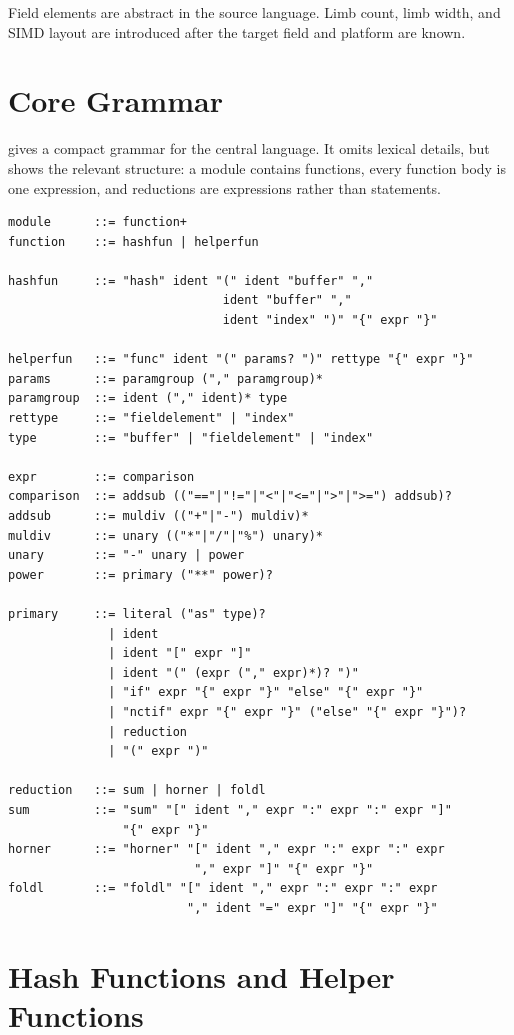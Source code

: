 Field elements are abstract in the source language. Limb count, limb width, and SIMD layout are introduced after the target field and platform are known.

\section{Core Grammar}
\label{sec:dsl-grammar}

 gives a compact grammar for the central language. It omits lexical details, but shows the relevant structure: a module contains functions, every function body is one expression, and reductions are expressions rather than statements.

\begin{lstlisting}[style=thesisBNF,caption={Core grammar of the DSL.},label={lst:dsl-grammar}]
module      ::= function+
function    ::= hashfun | helperfun

hashfun     ::= "hash" ident "(" ident "buffer" ","
                              ident "buffer" ","
                              ident "index" ")" "{" expr "}"

helperfun   ::= "func" ident "(" params? ")" rettype "{" expr "}"
params      ::= paramgroup ("," paramgroup)*
paramgroup  ::= ident ("," ident)* type
rettype     ::= "fieldelement" | "index"
type        ::= "buffer" | "fieldelement" | "index"

expr        ::= comparison
comparison  ::= addsub (("=="|"!="|"<"|"<="|">"|">=") addsub)?
addsub      ::= muldiv (("+"|"-") muldiv)*
muldiv      ::= unary (("*"|"/"|"%") unary)*
unary       ::= "-" unary | power
power       ::= primary ("**" power)?

primary     ::= literal ("as" type)?
              | ident
              | ident "[" expr "]"
              | ident "(" (expr ("," expr)*)? ")"
              | "if" expr "{" expr "}" "else" "{" expr "}"
              | "nctif" expr "{" expr "}" ("else" "{" expr "}")?
              | reduction
              | "(" expr ")"

reduction   ::= sum | horner | foldl
sum         ::= "sum" "[" ident "," expr ":" expr ":" expr "]"
                "{" expr "}"
horner      ::= "horner" "[" ident "," expr ":" expr ":" expr
                          "," expr "]" "{" expr "}"
foldl       ::= "foldl" "[" ident "," expr ":" expr ":" expr
                         "," ident "=" expr "]" "{" expr "}"
\end{lstlisting}

\section{Hash Functions and Helper Functions}
\label{sec:hash-helper-functions}

